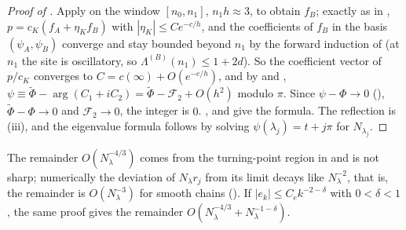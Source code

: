 \begin{proof}[Proof of ]
Apply  on the window $[n_0,n_1]$, $n_1h\approx3$, to obtain $f_B$; exactly as
in , $p=c_K(f_A+\eta_Kf_B)$ with $|\eta_K|\le Ce^{-c/h}$, and the coefficients of $f_B$
in the basis $(\psi_A,\psi_B)$ converge and stay bounded beyond $n_1$ by the forward
induction of  (at $n_1$ the site is oscillatory, so $\Lambda^{(B)}(n_1)\le1+2d$).
So the coefficient vector of $p/c_K$ converges to $C=c(\infty)+O(e^{-c/h})$, and by
 and , $\psi\equiv\tilde\Phi-\arg(C_1+iC_2)=\tilde\Phi-\mathcal F_2+O(h^2)$
modulo $\pi$. Since $\psi-\Phi\to0$ (), $\tilde\Phi-\Phi\to0$ and $\mathcal F_2\to0$, the
integer is $0$. ,  and  give the formula. The
reflection is (iii), and the eigenvalue formula follows by solving
$\psi(\lambda_j)=t+j\pi$ for $N_{\lambda_j}$.
\end{proof}

The remainder $O(N_\lambda^{-4/3})$ comes from the turning-point region in
 and is not sharp; numerically the deviation of $N_\lambda r_j$ from its limit decays
like $N_\lambda^{-2}$, that is, the remainder is $O(N_\lambda^{-3})$ for smooth chains (). If $|e_k|\le C_ek^{-2-\delta}$ with $0<\delta<1$, the same proof gives the
remainder $O(N_\lambda^{-4/3}+N_\lambda^{-1-\delta})$.
